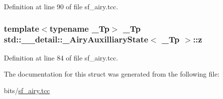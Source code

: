 Definition at line 90 of file sf\+\_\+airy.\+tcc.

\subsubsection[{\texorpdfstring{z}{z}}]{\setlength{\rightskip}{0pt plus 5cm}template$<$typename \+\_\+\+Tp$>$ \+\_\+\+Tp {\bf std\+::\+\_\+\+\_\+detail\+::\+\_\+\+Airy\+Auxilliary\+State}$<$ \+\_\+\+Tp $>$\+::z}\hypertarget{structstd_1_1____detail_1_1__AiryAuxilliaryState_a26111d17ff4b059217cbe9d5336435ce}{}\label{structstd_1_1____detail_1_1__AiryAuxilliaryState_a26111d17ff4b059217cbe9d5336435ce}


Definition at line 84 of file sf\+\_\+airy.\+tcc.



The documentation for this struct was generated from the following file\+:\begin{DoxyCompactItemize}
\item 
bits/\hyperlink{sf__airy_8tcc}{sf\+\_\+airy.\+tcc}\end{DoxyCompactItemize}
